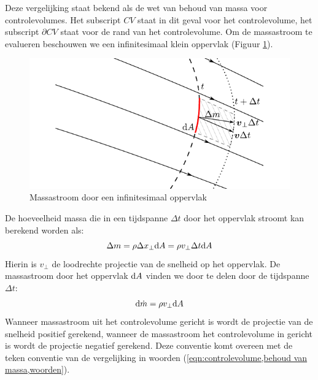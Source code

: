 Deze vergelijking staat bekend als de wet van behoud van massa voor controlevolumes. Het subscript $CV$ staat in dit geval voor het controlevolume, het subscript $\partial CV$ staat voor de rand van het controlevolume.
Om de massastroom te evalueren beschouwen we een infinitesimaal klein oppervlak (Figuur \ref{fig:massastroom}).
\begin{figure}[htb]
	\centering
	\includegraphics{fig/controlevolumes/massastroom}
	\caption{Massastroom door een infinitesimaal oppervlak}
	\label{fig:massastroom}
\end{figure}
De hoeveelheid massa die in een tijdspanne $\Delta t$ door het oppervlak stroomt kan berekend worden als:
\begin{equation}
	\Delta m = \rho \Delta x_{\perp} \mathrm{d} A = \rho v_{\perp} \Delta t \mathrm{d} A
	\label{eqn:hoeveelheid massa door een oppervlak}
\end{equation}
Hierin is $v_{\perp}$ de loodrechte projectie van de snelheid op het oppervlak. De massastroom door het oppervlak $\mathrm{d} A$ vinden we door te delen door de tijdspanne $\Delta t$:
\begin{equation}
	\mathrm{d} \dot{m}  = \rho v_{\perp} \mathrm{d} A
	\label{eqn:massastroom}
\end{equation}
Wanneer massastroom uit het controlevolume gericht is wordt de projectie van de snelheid positief gerekend, wanneer de massastroom het controlevolume in gericht is wordt de projectie negatief gerekend. Deze conventie komt overeen met de teken conventie van de vergelijking in woorden (\ref{eqn:controlevolume,behoud van massa,woorden}).

